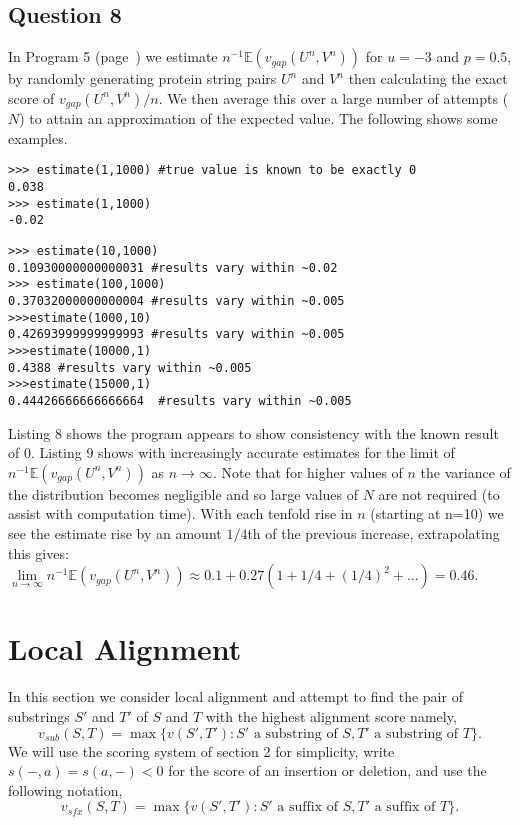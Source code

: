 \documentclass{article}
\begin{document}
\vspace{-0.5cm}
\subsection{Question 8}
\vspace{-0.3cm}
In Program 5 (page~\pageref{subsec:Program 5}) we estimate $n^{-1}\mathbb{E}(v_{gap}(U^n,V^n))$ for $u=-3$ and $p=0.5$, by randomly generating protein string pairs $U^n$ and $V^n$ then calculating the exact score of $v_{gap}(U^n,V^n)/n$. We then average this over a large number of attempts ($N$) to attain an approximation of the expected value. The following shows some examples.

\begin{lstlisting}
>>> estimate(1,1000) #true value is known to be exactly 0
0.038
>>> estimate(1,1000)
-0.02 
\end{lstlisting}

\begin{lstlisting}
>>> estimate(10,1000)
0.10930000000000031 #results vary within ~0.02
>>> estimate(100,1000)
0.37032000000000004 #results vary within ~0.005
>>>estimate(1000,10)
0.42693999999999993 #results vary within ~0.005
>>>estimate(10000,1) 
0.4388 #results vary within ~0.005
>>>estimate(15000,1)
0.44426666666666664  #results vary within ~0.005
\end{lstlisting}

Listing 8 shows the program appears to show consistency with the known result of 0. Listing 9 shows with increasingly accurate estimates for the limit of $n^{-1}\mathbb{E}(v_{gap}(U^n,V^n))$ as $n \to \infty$. Note that for higher values of $n$ the variance of the distribution becomes negligible and so large values of $N$ are not required (to assist with computation time). With each tenfold rise in $n$ (starting at n=10) we see the estimate rise by an amount $1/4$th of the previous increase, extrapolating this gives: $\underset{n\to \infty}{\lim} n^{-1}\mathbb{E}(v_{gap}(U^n,V^n)) \approx 0.1+0.27(1+1/4+(1/4)^2+...)=0.46$.
\vspace{-0.5cm}
\section{Local Alignment}
\vspace{-0.3cm}
In this section we consider local alignment and attempt to find the pair of substrings $S'$ and $T'$ of $S$ and $T$ with the highest alignment score namely,
\begin{equation*}
v_{sub}(S,T) = \max \{ v(S',T'):S' \text{ a substring of } S, T' \text{ a substring of } T \}.
\end{equation*} 
We will use the scoring system of section 2 for simplicity, write $s(-,a)=s(a,-)<0$ for the score of an insertion or deletion, and use the following notation,
\begin{equation*}
v_{sfx}(S,T)=\max \{ v(S',T'):S' \text{ a suffix of } S, T' \text{ a suffix of } T \}.
\end{equation*}
\vspace{-1cm}
\end{document}
